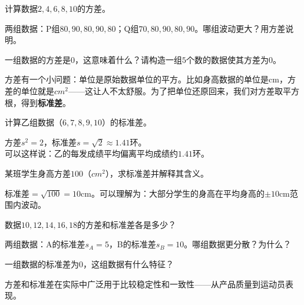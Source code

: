 \begin{exercise}
\item 计算数据$2,4,6,8,10$的方差。
\item 两组数据：P组$80,90,80,90,80$；Q组$70,80,90,80,90$。哪组波动更大？用方差说明。
\item 一组数据的方差是$0$，这意味着什么？请构造一组$5$个数的数据使其方差为$0$。
\end{exercise}


方差有一个小问题：单位是原始数据单位的平方。比如身高数据的单位是cm，方差的单位就是$cm^2$——这让人不太舒服。为了把单位还原回来，我们对方差取平方根，得到\textbf{标准差}。


\begin{example}
计算乙组数据（$6,7,8,9,10$）的标准差。
\end{example}
\begin{solution}
方差$s^2=2$，标准差$s=\sqrt2\approx1.41$环。\\
可以这样说：乙的每发成绩平均偏离平均成绩约$1.41$环。
\end{solution}

\begin{example}
某班学生身高方差$100$（$cm^2$），求标准差并解释其含义。
\end{example}
\begin{solution}
标准差$=\sqrt{100}=10$cm。可以理解为：大部分学生的身高在平均身高的$\pm10$cm范围内波动。
\end{solution}

\begin{exercise}
\item 数据$10,12,14,16,18$的方差和标准差各是多少？
\item 两组数据：A的标准差$s_A=5$，B的标准差$s_B=10$。哪组数据更分散？为什么？
\item 一组数据的标准差为$0$，这组数据有什么特征？
\end{exercise}


方差和标准差在实际中广泛用于比较稳定性和一致性——从产品质量到运动员表现。

